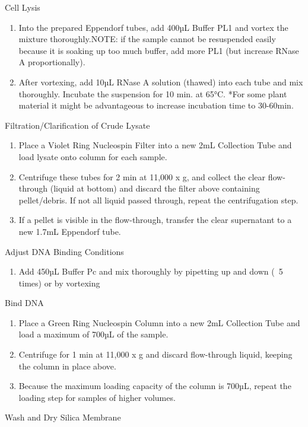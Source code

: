 \documentclass[12pt]{../SOP3_alpha}
\begin{document}
 

\NP Cell Lysis
\begin{enumerate}
  \item Into the prepared Eppendorf tubes, add 400µL Buffer PL1 and vortex the mixture thoroughly.NOTE: if the sample cannot be resuspended easily because it is soaking up too much buffer, add more PL1 (but increase RNase A proportionally).
  \item After vortexing, add 10µL RNase A solution (thawed) into each tube and mix thoroughly.
Incubate the suspension for 10 min. at 65°C. *For some plant material it might be advantageous to increase incubation time to 30-60min. 
\end{enumerate}


\NP Filtration/Clarification of Crude Lysate
\begin{enumerate}
  \item Place a Violet Ring Nucleospin Filter into a new 2mL Collection Tube and load lysate onto column for each sample. 
  \item Centrifuge these tubes for 2 min at 11,000 x g, and collect the clear flow-through (liquid at bottom) and discard the filter above containing pellet/debris. If not all liquid passed through, repeat the centrifugation step.
  \item  If a pellet is visible in the flow-through, transfer the clear supernatant to a new 1.7mL Eppendorf tube. 
\end{enumerate}

\NP Adjust DNA Binding Conditions
\begin{enumerate}
  \item Add 450µL Buffer Pc and mix thoroughly by pipetting up and down (~5 times) or by vortexing
\end{enumerate}

\NP Bind DNA
\begin{enumerate}
  \item Place a Green Ring Nucleospin Column into a new 2mL Collection Tube and load a maximum of 700µL of the sample.
  \item Centrifuge for 1 min at 11,000 x g and discard flow-through liquid, keeping the column in place above. 
  \item Because the maximum loading capacity of the column is 700µL, repeat the loading step for samples of higher volumes.
\end{enumerate}
  
\NP Wash and Dry Silica Membrane
\end{document}

